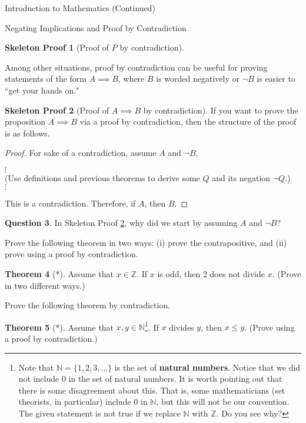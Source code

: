 \documentclass[11pt]{article}
\theoremstyle{definition}
\newtheorem{theorem}{Theorem}[section]
\newtheorem{question}[theorem]{Question}
\newtheorem{skeleton}[theorem]{Skeleton Proof}
\newenvironment{textbox}{\noindent\begin{lrbox}{\savepar}\begin{minipage}[c]{.98\textwidth}}{\end{minipage}\end{lrbox}\fcolorbox{black}{white}{\usebox{\savepar}}}
\begin{document}
\begin{section}{Introduction to Mathematics (Continued)}
\begin{subsection}{Negating Implications and Proof by Contradiction}
\begin{skeleton}[Proof of $P$ by contradiction]
\end{skeleton}

Among other situations, proof by contradiction can be useful for proving statements of the form $A\implies B$, where $B$ is worded negatively or $\neg B$ is easier to ``get your hands on."  

\begin{skeleton}[Proof of $A\implies B$ by contradiction]\label{pf by contradiction for implication}
If you want to prove the proposition $A\implies B$ via a proof by contradiction, then the structure of the proof is as follows.

\bigskip

\begin{textbox}
\begin{proof}
For sake of a contradiction, assume $A$ and $\neg B$.
\begin{center}
$\vdots$\\
(Use definitions and previous theorems to derive some $Q$ and its negation $\neg Q$.)\\
$\vdots$
\end{center}
\noindent This is a contradiction.  Therefore, if $A$, then $B$.
\end{proof}
\end{textbox}
\end{skeleton}

\begin{question}
In Skeleton Proof \ref{pf by contradiction for implication}, why did we start by assuming $A$ and $\neg B$?
\end{question}

Prove the following theorem in two ways: (i) prove the contrapositive, and (ii) prove using a proof by contradiction.

\begin{theorem}[*]
Assume that $x\in\mathbb{Z}$.  If $x$ is odd, then 2 does not divide $x$. (Prove in two different ways.)
\end{theorem}

Prove the following theorem by contradiction.

\begin{theorem}[*]
Assume that $x,y\in\mathbb{N}$\footnote{Note that $\mathbb{N}=\{1,2,3,\ldots\}$ is the set of \textbf{natural numbers}. Notice that we did not include $0$ in the set of natural numbers.  It is worth pointing out that there is some disagreement about this.  That is, some mathematicians (set theorists, in particular) include $0$ in $\mathbb{N}$, but this will not be our convention.  The given statement is not true if we replace $\mathbb{N}$ with $\mathbb{Z}$.  Do you see why?}.  If $x$ divides $y$, then $x\leq y$. (Prove using a proof by contradiction.)
\end{theorem}


\end{subsection}
\end{section}
\end{document}
